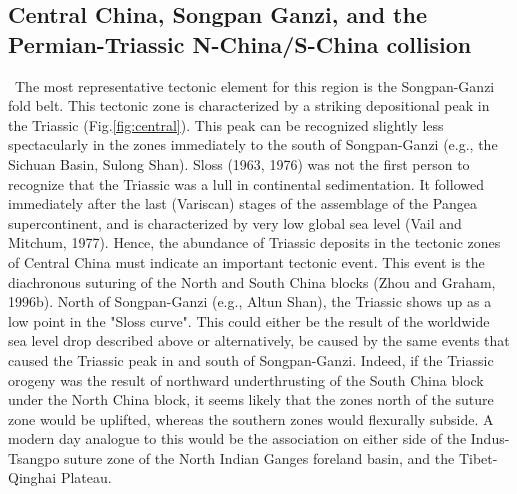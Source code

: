 \documentclass{article}
\begin{document}
 \subsection*{Central China, Songpan Ganzi, and the 
 Permian-Triassic  N-China/S-China collision} \label{sec:songpanganze}
 ~\indent The  most representative tectonic element for  this region is
 the Songpan-Ganzi fold belt.   This tectonic zone is characterized by
 a     striking     depositional      peak     in     the     Triassic
 (Fig.\ref{fig:central}).  This peak can  be recognized  slightly less
 spectacularly in the zones  immediately to the south of Songpan-Ganzi
 (e.g., the  Sichuan Basin, Sulong  Shan). Sloss (1963, 1976)  was not
 the  first  person to  recognize  that the  Triassic  was  a lull  in
 continental  sedimentation.  It followed  immediately after  the last
 (Variscan) stages of the assemblage of the Pangea supercontinent, and
 is  characterized by  very low  global sea  level (Vail  and Mitchum,
 1977).   Hence, the abundance  of Triassic  deposits in  the tectonic
 zones  of   Central  China   must  indicate  an   important  tectonic
 event. This event is the  diachronous suturing of the North and South
 China blocks (Zhou and  Graham, 1996b). North of Songpan-Ganzi (e.g.,
 Altun  Shan), the  Triassic shows  up as  a low  point in  the "Sloss
 curve". This  could either be the  result of the  worldwide sea level
 drop described above  or alternatively, be caused by  the same events
 that caused the Triassic peak  in and south of Songpan-Ganzi. Indeed,
 if the Triassic orogeny was the result of northward underthrusting of
 the South  China block under the  North China block,  it seems likely
 that the  zones north of the  suture zone would  be uplifted, whereas
 the southern zones would flexurally subside. A modern day analogue to
 this would  be the  association on either  side of  the Indus-Tsangpo
 suture  zone of  the  North  Indian Ganges  foreland  basin, and  the
 Tibet-Qinghai Plateau.
\end{document}
